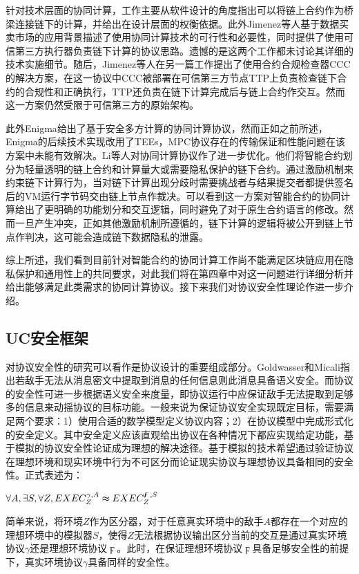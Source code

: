 针对技术层面的协同计算，工作\cite{7516828}主要从软件设计的角度指出可以将链上合约作为桥梁连接链下的计算，并给出在设计层面的权衡依据。此外Jimenez等人\cite{10.1007/978-3-030-10549-5_27}基于数据买卖市场的应用背景描述了使用协同计算技术的可行性和必要性，同时提供了使用可信第三方执行器负责链下计算的协议思路。遗憾的是这两个工作都未讨论其详细的技术实施细节。随后，Jimenez等人在另一篇工作\cite{molina2018implementation}提出了使用合约合规检查器CCC\cite{CCC}的解决方案，在这一协议中CCC被部署在可信第三方节点TTP上负责检查链下合约的合规性和正确执行，TTP还负责在链下计算完成后与链上合约作交互。然而这一方案仍然受限于可信第三方的原始架构。

此外Enigma\cite{2015arXiv150603471Z}给出了基于安全多方计算的协同计算协议，然而正如之前所述，Enigma的后续技术实现改用了TEEs，MPC协议存在的传输保证和性能问题在该方案中未能有效解决。Li等人\cite{li2019scalable}对协同计算协议作了进一步优化。他们将智能合约划分为轻量透明的链上合约和计算量大或需要隐私保护的链下合约。通过激励机制来约束链下计算行为，当对链下计算出现分歧时需要挑战者与结果提交者都提供签名后的VM运行字节码交由链上节点作裁决。可以看到这一方案对智能合约的协同计算给出了更明确的功能划分和交互逻辑，同时避免了对于原生合约语言的修改。然而一旦产生冲突，正如其他激励机制所遵循的，链下计算的逻辑将被公开到链上节点作判决，这可能会造成链下数据隐私的泄露。

综上所述，我们看到目前针对智能合约的协同计算工作尚不能满足区块链应用在隐私保护和通用性上的共同要求，对此我们将在第四章中对这一问题进行详细分析并给出能够满足此类需求的协同计算协议。接下来我们对协议安全性理论作进一步介绍。
\subsection{UC安全框架}
对协议安全性的研究可以看作是协议设计的重要组成部分。Goldwasser和Micali\cite{10.1145/800070.802212}指出若敌手无法从消息密文中提取到消息的任何信息则此消息具备语义安全。而协议的安全性可进一步根据语义安全来度量，即协议运行中应保证敌手无法提取到足够多的信息来动摇协议的目标功能。一般来说为保证协议安全实现既定目标，需要满足两个要求：1）使用合适的数学模型定义协议内容；2）在协议模型中完成形式化的安全定义。其中安全定义应该直观给出协议在各种情况下都应实现给定功能，基于模拟的协议安全性论证成为理想的解决途径。基于模拟的技术\cite{10.1145/22145.22178}希望通过验证协议在理想环境和现实环境中行为不可区分而论证现实协议与理想协议具备相同的安全性。正式表述为：
\begin{center}
    $\forall A, \exists S, \forall Z, EXEC^{\gamma, A}_Z \thickapprox EXEC^{\digamma, S}_Z$\cite{cryptoeprint:2007/102}
\end{center}
简单来说，将环境$Z$作为区分器，对于任意真实环境中的敌手$A$都存在一个对应的理想环境中的模拟器$S$，使得$Z$无法根据协议输出区分当前的交互是通过真实环境协议$\gamma$还是理想环境协议$\digamma$。此时，在保证理想环境协议$\digamma$具备足够安全性的前提下，真实环境协议$\gamma$具备同样的安全性。


